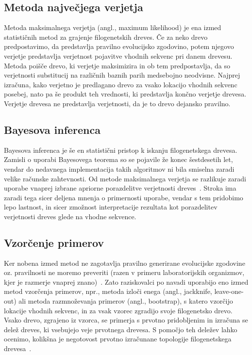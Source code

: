 \documentclass[a4paper, 12pt]{book}
\begin{document}
\subsection{Metoda največjega verjetja}
Metoda maksimalnega verjetja (angl., maximum likelihood) je ena izmed statističnih
metod za grajenje filogenetskih dreves. Če za neko drevo predpostavimo, da predstavlja
pravilno evolucijsko zgodovino, potem njegovo verjetje predstavlja verjetnost 
pojavitve vhodnih sekvenc pri danem drevesu. Metoda poišče drevo, ki verjetje 
maksimizira in ob tem predpostavlja, da so verjetnosti substitucij na različnih 
baznih parih medsebojno neodvisne. Najprej izračuna, kako verjetno je predlagano 
drevo za vsako lokacijo vhodnih sekvenc posebej, nato pa še produkt teh vrednosti, 
ki predstavlja končno verjetje drevesa. Verjetje drevesa ne predstavlja verjetnosti, 
da je to drevo dejansko pravilno. 

\subsection{Bayesova inferenca}
Bayesova inferenca je še en statistični pristop k iskanju filogenetskega drevesa. 
Zamisli o uporabi Bayesovega teorema so se pojavile že konec šestdesetih let, 
vendar do nedavnega implementacija takih algoritmov ni bila smiselna zaradi velike
računske zahtevnosti. Od metode maksimalnega verjetja se razlikuje zaradi uporabe 
vnaprej izbrane apriorne porazdelitve verjetnosti dreves~\cite{fel}. Stroka ima 
zaradi tega sicer deljena mnenja o primernosti uporabe, vendar s tem pridobimo 
lepo lastnost, in sicer zmožnost interpretacije rezultata kot porazdelitev 
verjetnosti dreves glede na vhodne sekvence.

\subsection{Vzorčenje primerov}

Ker nobena izmed metod ne zagotavlja pravilno generirane evolucijske zgodovine 
oz. pravilnosti ne moremo preveriti (razen v primeru laboratorijskih organizmov, 
kjer je razmerje vnaprej znano)~\cite{phy}. Zato raziskovalci po navadi uporabijo eno 
izmed metod vzorčenja primerov, npr., metoda izloči enega (angl., jackknife, leave-one-out) ali 
metoda razmnoževanja primerov (angl., bootstrap), s katero vzorčijo 
lokacije vhodnih sekvenc, in za vsak vzorec zgradijo svoje filogenetsko drevo. 
Vsako drevo, zgrajeno iz vzorca, se primerja s prvotno pridobljenim in izračuna 
se delež dreves, ki vsebujejo veje prvotnega drevesa. S pomočjo teh deležev 
lahko ocenimo, kolikšna je negotovost prvotno izračunane topologije 
filogenetskega drevesa~\cite{fel}.   
\end{document}
